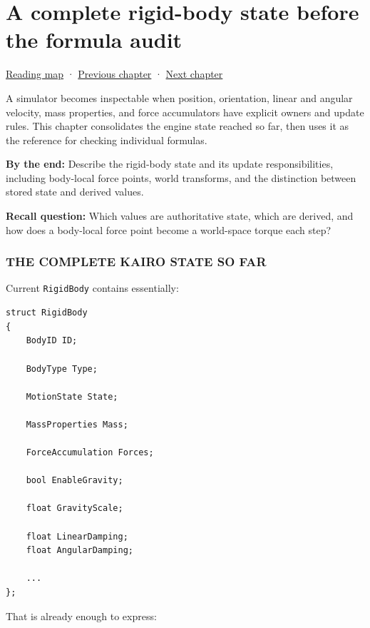 \hypertarget{06-engine-ii-ch035}{}
\chapter{A complete rigid-body state before the formula audit}\label{stagechapter:06-engine-ii-ch035}\label{06-engine-ii-ch035-a-complete-rigid-body-state-before-the-formula-audit}

\hyperref[volume-reading-map]{Reading map} · \hyperref[06-engine-ii-ch034-rigid-body-motion-from-forces-to-contact]{Previous chapter} · \hyperref[06-engine-ii-ch036-auditing-capsule-mass-properties-and-collision-formulas]{Next chapter}

A simulator becomes inspectable when position, orientation, linear and angular velocity, mass properties, and force accumulators have explicit owners and update rules. This chapter consolidates the engine state reached so far, then uses it as the reference for checking individual formulas.

\textbf{By the end:} Describe the rigid-body state and its update responsibilities, including body-local force points, world transforms, and the distinction between stored state and derived values.

\textbf{Recall question:} Which values are authoritative state, which are derived, and how does a body-local force point become a world-space torque each step?

\subsection{THE COMPLETE KAIRO STATE SO FAR}\label{06-engine-ii-ch035-the-complete-kairo-state-so-far}

Current \texttt{RigidBody} contains essentially:

\begin{verbatim}
struct RigidBody
{
    BodyID ID;

    BodyType Type;

    MotionState State;

    MassProperties Mass;

    ForceAccumulation Forces;

    bool EnableGravity;

    float GravityScale;

    float LinearDamping;
    float AngularDamping;

    ...
};
\end{verbatim}

That is already enough to express:

